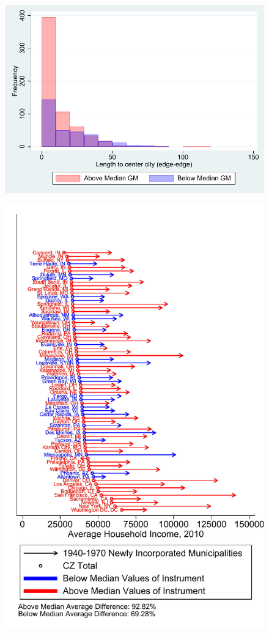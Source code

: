 \documentclass{article}
\begin{document}
\begin{landscape}
\
\clearpage

\clearpage
\begin{figure}
	\includegraphics{figures/implications/dist_edge_edge_4070.pdf}
\end{figure}
\clearpage
\begin{figure}
	\includegraphics{figures/pcarrow_figure_inc2010.pdf}

\end{figure}
\end{landscape}
\end{document}
